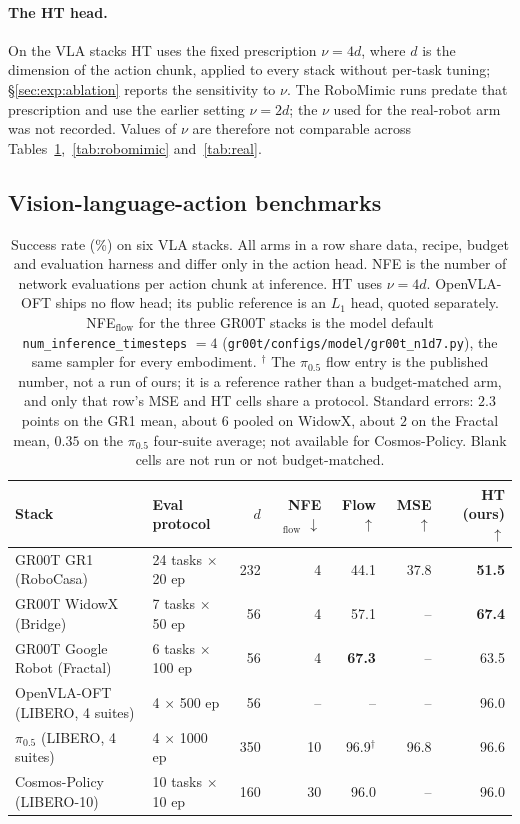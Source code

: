\paragraph{The HT head.} On the VLA stacks HT uses the fixed prescription
$\nu = 4d$, where $d$ is the dimension of the action chunk, applied to every
stack without per-task tuning; \S\ref{sec:exp:ablation} reports the sensitivity
to $\nu$. The RoboMimic runs predate that prescription and use the earlier
setting $\nu = 2d$; the $\nu$ used for the real-robot arm was not recorded.
Values of $\nu$ are therefore not comparable across
Tables~\ref{tab:vla},~\ref{tab:robomimic} and~\ref{tab:real}.

\subsection{Vision-language-action benchmarks}
\label{sec:exp:vla}

\begin{table}[t]
\centering
\caption{Success rate (\%) on six VLA stacks. All arms in a row share data,
recipe, budget and evaluation harness and differ only in the action head. NFE
is the number of network evaluations per action chunk at inference. HT uses
$\nu = 4d$. OpenVLA-OFT ships no flow head; its public reference is an $L_1$
head, quoted separately. NFE$_\text{flow}$ for the three GR00T stacks is the
model default \texttt{num\_inference\_timesteps} $= 4$
(\texttt{gr00t/configs/model/gr00t\_n1d7.py}), the same sampler for every
embodiment. $^\dagger$ The $\pi_{0.5}$ flow entry is the published number, not a
run of ours; it is a reference rather than a budget-matched arm, and only that
row's MSE and HT cells share a protocol. Standard errors: $2.3$ points on the GR1 mean, about $6$ pooled on
WidowX, about $2$ on the Fractal mean, $0.35$ on the $\pi_{0.5}$ four-suite
average; not available for Cosmos-Policy. Blank cells are not run or not
budget-matched.}
\label{tab:vla}
\begin{tabular}{llrrrrr}
\toprule
Stack & Eval protocol & $d$ & NFE$_\text{flow}$ $\downarrow$ & Flow $\uparrow$ & MSE $\uparrow$ & HT (ours) $\uparrow$ \\
\midrule
GR00T GR1 (RoboCasa)        & 24 tasks $\times$ 20 ep   & 232 & 4  & 44.1 & 37.8 & \textbf{51.5} \\
GR00T WidowX (Bridge)       & 7 tasks $\times$ 50 ep    & 56  & 4  & 57.1 & --   & \textbf{67.4} \\
GR00T Google Robot (Fractal)& 6 tasks $\times$ 100 ep   & 56  & 4  & \textbf{67.3} & -- & 63.5 \\
OpenVLA-OFT (LIBERO, 4 suites)& 4 $\times$ 500 ep       & 56  & -- & --   & --   & 96.0 \\
$\pi_{0.5}$ (LIBERO, 4 suites)& 4 $\times$ 1000 ep      & 350 & 10 & 96.9$^\dagger$ & 96.8 & 96.6 \\
Cosmos-Policy (LIBERO-10)   & 10 tasks $\times$ 10 ep   & 160 & 30 & 96.0 & --   & 96.0 \\
\bottomrule
\end{tabular}
\end{table}

